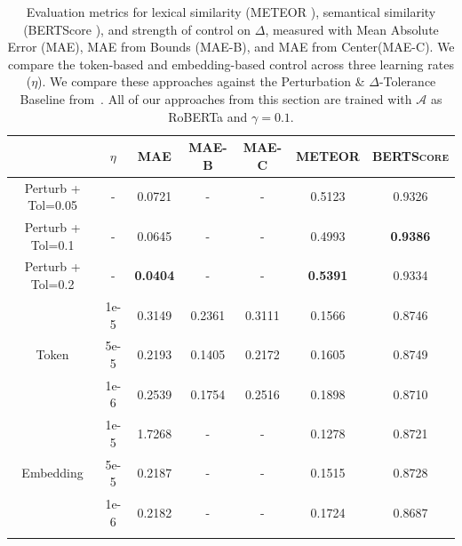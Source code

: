 \begin{table}[]
\centering
\small
\caption{Evaluation metrics for lexical similarity (METEOR \citep{lavie-agarwal-2007-meteor}), semantical similarity (BERTScore \citep{zhang2019bertscore}), and strength of control on $\Delta$, measured with Mean Absolute Error (MAE), MAE from Bounds (MAE-B), and MAE from Center(MAE-C). We compare the token-based and embedding-based control across three learning rates ($\eta$). We compare these approaches against the Perturbation \& $\Delta$-Tolerance Baseline from~. All of our approaches from this section are trained with $\mathcal{A}$ as RoBERTa and $\gamma=0.1$.}
\label{tab:ac_lr_variation}

% 
\begin{tabularx}{\linewidth}{@{\extracolsep{\fill}} ccccccc}
\toprule[1.5pt]
                              & $\eta$           & \textsc{MAE}    & \textsc{MAE-B} & \textsc{MAE-C} & \textsc{METEOR} & \textsc{BERTScore} \\
\midrule[0.75pt]
Perturb + Tol=0.05            & -                & 0.0721          & -              & -              & 0.5123          & 0.9326 \\
Perturb + Tol=0.1             & -                & 0.0645          & -              & -              & 0.4993          & \textbf{0.9386} \\
Perturb + Tol=0.2             & -                & \textbf{0.0404} & -              & -              & \textbf{0.5391} & 0.9334 \\
\midrule[0.75pt]
                              & 1e-5      & 0.3149          & 0.2361         & 0.3111         & 0.1566          & 0.8746  \\
\multicolumn{1}{c}{Token}     & 5e-5      & 0.2193          & 0.1405         & 0.2172         & 0.1605          & 0.8749  \\
                              & 1e-6      & 0.2539          & 0.1754         & 0.2516         & 0.1898          & 0.8710  \\
\midrule[0.75pt]
                              & 1e-5      & 1.7268          & -              & -              & 0.1278          & 0.8721  \\
\multicolumn{1}{c}{Embedding} & 5e-5      & 0.2187          & -              & -              & 0.1515          & 0.8728  \\
                              & 1e-6      & 0.2182          & -              & -              & 0.1724          & 0.8687  \\
  \bottomrule[1.5pt]\\
\end{tabularx}
\end{table}

